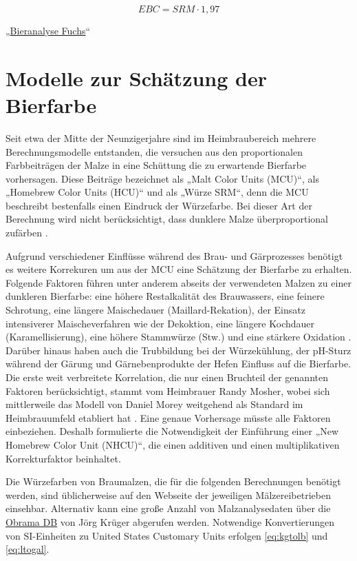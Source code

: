 \documentclass[a4paper,parskip=half]{scrartcl}
\newcommand{\EBC}{\mathit{EBC}}
\newcommand{\SRM}{\mathit{SRM}}
\begin{document}
\begin{equation}
\EBC = \SRM \cdot 1,97
\label{eq:ebctosrm}
\end{equation}

\parencite{Fengxia2004}
\parencite{Caro2019}

„\href{https://bieranalyse.de}{Bieranalyse Fuchs}“

\section*{Modelle zur Schätzung der Bierfarbe}

Seit etwa der Mitte der Neunzigerjahre sind im Heimbraubereich mehrere Berechnungsmodelle entstanden, die versuchen aus den proportionalen Farbbeiträgen der Malze in eine Schüttung die zu erwartende Bierfarbe vorhersagen. Diese Beiträge bezeichnet \textcite[61]{Daniels1996} als „Malt Color Units (MCU)“, \textcite[34]{Mosher1994} als „Homebrew Color Units (HCU)“  und \textcite[10]{Holle2010} als „Würze SRM“, denn die MCU beschreibt bestenfalls einen Eindruck der Würzefarbe. Bei dieser Art der Berechnung wird nicht berücksichtigt, dass dunklere Malze überproportional zufärben \parencite{KrausWeyermann2021c}.

Aufgrund verschiedener Einflüsse während des Brau- und Gärprozesses benötigt es weitere Korrekuren um aus der MCU eine Schätzung der Bierfarbe zu erhalten. Folgende Faktoren führen unter anderem abseits der verwendeten Malzen zu einer dunkleren Bierfarbe: eine höhere Restalkalität des Brauwassers, eine feinere Schrotung, eine längere Maischedauer (Maillard-Rekation), der Einsatz intensiverer Maischeverfahren wie der Dekoktion, eine längere Kochdauer (Karamellisierung), eine höhere Stammwürze (Stw.) und eine stärkere Oxidation \parencites{KrausWeyermann2021c}[78]{Hanghofer2019}. Darüber hinaus haben auch die Trubbildung bei der Würzekühlung, der pH-Sturz während der Gärung und  Gärnebenprodukte der Hefen Einfluss auf die Bierfarbe. Die erste weit verbreitete Korrelation, die nur einen Bruchteil der genannten Faktoren berücksichtigt, stammt vom Heimbrauer Randy Mosher, wobei sich mittlerweile das Modell von Daniel Morey weitgehend als Standard im Heimbrauumfeld etabliert hat \parencite{KrausWeyermann2021b}. Eine genaue Vorhersage müsste alle Faktoren einbeziehen. Deshalb formulierte \textcite{Colby2000} die Notwendigkeit der Einführung einer „New Homebrew Color Unit (NHCU)“, die einen additiven und einen multiplikativen Korrekturfaktor beinhaltet.

Die Würzefarben von Braumalzen, die für die folgenden Berechnungen benötigt werden, sind üblicherweise auf den Webseite der jeweiligen Mälzereibetrieben einsehbar. Alternativ kann eine große Anzahl von Malzanalysedaten über die \href{https://obrama.mueggelland.de}{Obrama DB} von Jörg Krüger abgerufen werden. Notwendige Konvertierungen von SI-Einheiten zu United States Customary Units erfolgen \autoref{eq:kgtolb} und \autoref{eq:ltogal}.
\end{document}
